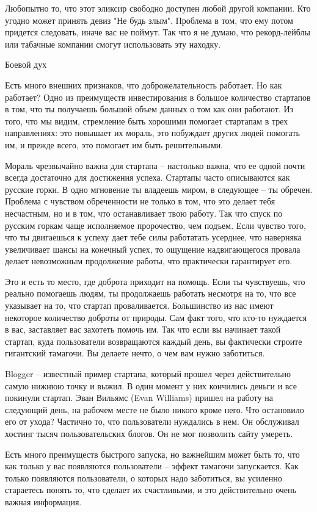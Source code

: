 \documentclass[ebook,12pt,oneside,openany]{memoir}
\begin{document}
Любопытно то, что этот эликсир свободно доступен любой другой
компании. Кто угодно может принять девиз "Не будь злым". Проблема в
том, что ему потом придется следовать, иначе вас не поймут. Так что я
не думаю, что рекорд-лейблы или табачные компании смогут использовать
эту находку.

Боевой дух

Есть много внешних признаков, что доброжелательность работает. Но как
работает? Одно из преимуществ инвестирования в большое количество
стартапов в том, что ты получаешь большой объем данных о том как они
работают. Из того, что мы видим, стремление быть хорошими помогает
стартапам в трех направлениях: это повышает их мораль, это побуждает
других людей помогать им, и прежде всего, это помогает им быть
решительными.

Мораль чрезвычайно важна для стартапа -- настолько важна, что ее одной
почти всегда достаточно для достижения успеха. Стартапы часто
описываются как русские горки. В одно мгновение ты владеешь миром, в
следующее -- ты обречен. Проблема с чувством обреченности не только в
том, что это делает тебя несчастным, но и в том, что останавливает
твою работу. Так что спуск по русским горкам чаще исполняемое
пророчество, чем подъем. Если чувство того, что ты двигаешься к успеху
дает тебе силы работатать усерднее, что наверняка увеличивает шансы на
конечный успех, то ощущение надвигающегося провала делает невозможным
продолжение работы, что практически гарантирует его.

Это и есть то место, где доброта приходит на помощь. Если ты
чувствуешь, что реально помогаешь людям, ты продолжаешь работать
несмотря на то, что все указывает на то, что стартап проваливается.
Большинство из нас имеют некоторое количество доброты от природы. Сам
факт того, что кто-то нуждается в вас, заставляет вас захотеть помочь
им. Так что если вы начинает такой стартап, куда пользователи
возвращаются каждый день, вы фактически строите гигантский тамагочи.
Вы делаете нечто, о чем вам нужно заботиться.

Blogger -- известный пример стартапа, который прошел через
действительно самую нижнюю точку и выжил. В один момент у них
кончились деньги и все покинули стартап. Эван Вильямс (Evan Williams)
пришел на работу на следующий день, на рабочем месте не было никого
кроме него. Что остановило его от ухода? Частично то, что пользователи
нуждались в нем. Он обслуживал хостинг тысяч пользовательских блогов.
Он не мог позволить сайту умереть.

Есть много преимуществ быстрого запуска, но важнейшим может быть то,
что как только у вас появляются пользователи -- эффект тамагочи
запускается. Как только появляются пользователи, о которых надо
заботиться, вы усиленно стараетесь понять то, что сделает их
счастливыми, и это действительно очень важная информация.
\end{document}
